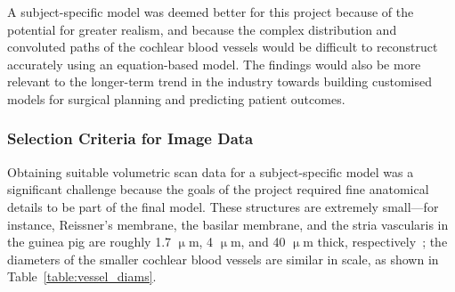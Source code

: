 A subject-specific model was deemed better for this project because of the
potential for greater realism, and because the complex distribution and
convoluted paths of the cochlear blood vessels would be difficult to reconstruct
accurately using an equation-based model. The findings would also be more
relevant to the longer-term trend in the industry towards building customised
models for surgical planning and predicting patient outcomes.

\subsubsection{Selection Criteria for Image Data}

Obtaining suitable volumetric scan data for a subject-specific model was a
significant challenge because the goals of the project required fine anatomical
details to be part of the final model. These structures are extremely
small---for instance, Reissner's membrane, the basilar membrane, and the stria
vascularis in the guinea pig are roughly 1.7 $ \upmu $m, 4 $ \upmu $m, and 40 $
\upmu $m thick, respectively~\cite{frijns1995}; the diameters of the smaller
cochlear blood vessels are similar in scale, as shown in
Table~\ref{table:vessel_diams}.

